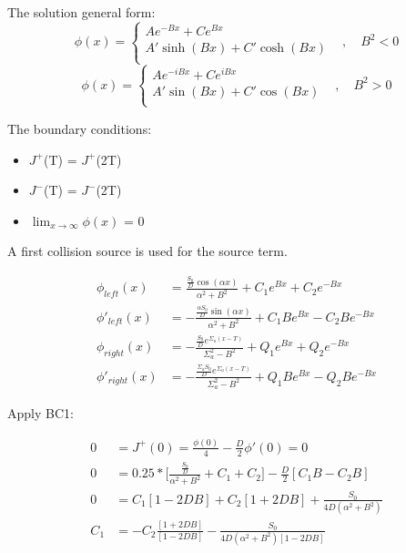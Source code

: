 \documentclass{amsart}
\theoremstyle{definition}
\begin{document}
The solution general form:
\bigbreak
\[   \phi(x) = \left\{
\begin{array}{ll}
      Ae^{-Bx} + Ce^{Bx} &  \\
      A'\sinh(Bx) + C'\cosh(Bx) &  \\
\end{array}
\right. , \quad B^2 < 0\]
\bigbreak
\[   \phi(x) = \left\{
\begin{array}{ll}
      Ae^{-iBx} + Ce^{iBx} &  \\
      A'\sin(Bx) + C'\cos(Bx) &  \\
\end{array}
\right. , \quad B^2 > 0\]
\bigbreak


The boundary conditions:
\begin{itemize}
    \item $J^+$(T) = $J^+$(2T)
    \item $J^-$(T) = $J^-$(2T)
    \item $\lim_{x \to \infty} \phi(x)$ = 0
\end{itemize}
\bigbreak



A first collision source is used for the source term.

\begin{align*}

    \phi_{left}(x) &= \frac{\frac{S_0}{D}\cos(\alpha x)}{\alpha^2+B^2}+C_1e^{Bx}+C_2e^{-Bx} \\

    \phi'_{left}(x) &= -\frac{\frac{\alpha S_0}{D}\sin(\alpha x)}{\alpha^2+B^2}+C_1Be^{Bx}-C_2Be^{-Bx} \\

    \phi_{right}(x) &= -\frac{\frac{S_0}{D}e^{\Sigma_a(x-T)}}{\Sigma_a^2-B^2}+Q_1e^{Bx}+Q_2e^{-Bx} \\

    \phi'_{right}(x) &= -\frac{\frac{\Sigma_a S_0}{D}e^{\Sigma_a(x-T)}}{\Sigma_a^2-B^2}+Q_1Be^{Bx}-Q_2Be^{-Bx}

\end{align*}

\bigbreak

Apply BC1:

\begin{align*}

    0 &= J^+(0) =\frac{\phi(0)}{4}-\frac{D}{2}\phi'(0)=0 \\

    0 &= 0.25*\bigg[\frac{\frac{S_0}{D}}{\alpha^2+B^2}+C_1+C_2\bigg]-\frac{D}{2}[C_1B-C_2B] \\

    0 &= C_1[1-2DB]+C_2[1+2DB]+\frac{S_0}{4D(\alpha^2+B^2)} \\

    C_1 &= -C_2\frac{[1+2DB]}{[1-2DB]}-\frac{S_0}{4D(\alpha^2+B^2)[1-2DB]}

\end{align*}
\end{document}
